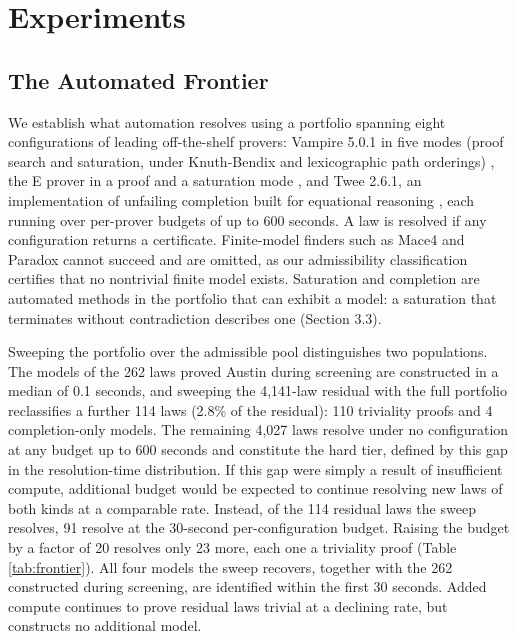 \documentclass[letterpaper]{article} %
\begin{document}
\section{Experiments}

\subsection{The Automated Frontier}

We establish what automation resolves using a portfolio spanning eight configurations of leading off-the-shelf provers: Vampire 5.0.1 in five modes (proof search and saturation, under Knuth-Bendix and lexicographic path orderings) \citep{kovacs2013first}, the E prover in a proof and a saturation mode \citep{schulz2019faster}, and Twee 2.6.1, an implementation of unfailing completion built for equational reasoning \citep{smallbone2021twee}, each running over per-prover budgets of up to 600 seconds. A law is resolved if any configuration returns a certificate. Finite-model finders such as Mace4 \citep{mccune2003mace4} and Paradox \citep{claessen2003new} cannot succeed and are omitted, as our admissibility classification certifies that no nontrivial finite model exists. Saturation and completion are automated methods in the portfolio that can exhibit a model: a saturation that terminates without contradiction describes one (Section 3.3).

Sweeping the portfolio over the admissible pool distinguishes two populations. The models of the 262 laws proved Austin during screening are constructed in a median of 0.1 seconds, and sweeping the 4,141-law residual with the full portfolio reclassifies a further 114 laws (2.8\% of the residual): 110 triviality proofs and 4 completion-only models. The remaining 4,027 laws resolve under no configuration at any budget up to 600 seconds and constitute the hard tier, defined by this gap in the resolution-time distribution. If this gap were simply a result of insufficient compute, additional budget would be expected to continue resolving new laws of both kinds at a comparable rate. Instead, of the 114 residual laws the sweep resolves, 91 resolve at the 30-second per-configuration budget. Raising the budget by a factor of 20 resolves only 23 more, each one a triviality proof (Table \ref{tab:frontier}). All four models the sweep recovers, together with the 262 constructed during screening, are identified within the first 30 seconds. Added compute continues to prove residual laws trivial at a declining rate, but constructs no additional model.
\end{document}
